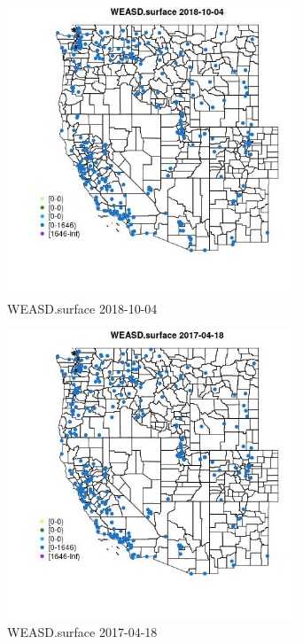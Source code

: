 \begin{figure} 
\centering  
\includegraphics[width=0.77\textwidth]{Code_Outputs/Report_ML_input_PM25_Step4_part_f_de_duplicated_aveswNAs_MapObsWEASDsurface2018-10-04.jpg} 
\caption{\label{fig:Report_ML_input_PM25_Step4_part_f_de_duplicated_aveswNAsMapObsWEASDsurface2018-10-04}WEASD.surface 2018-10-04} 
\end{figure} 
 

\begin{figure} 
\centering  
\includegraphics[width=0.77\textwidth]{Code_Outputs/Report_ML_input_PM25_Step4_part_f_de_duplicated_aveswNAs_MapObsWEASDsurface2017-04-18.jpg} 
\caption{\label{fig:Report_ML_input_PM25_Step4_part_f_de_duplicated_aveswNAsMapObsWEASDsurface2017-04-18}WEASD.surface 2017-04-18} 
\end{figure} 
 

